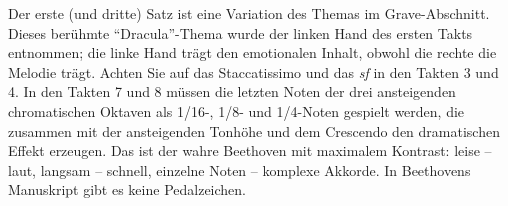Der erste (und dritte) Satz ist eine Variation des Themas im Grave-Abschnitt. 
Dieses berühmte \enquote{Dracula}-Thema wurde der linken Hand des ersten Takts entnommen; die linke Hand trägt den emotionalen Inhalt, obwohl die rechte die Melodie trägt.
Achten Sie auf das Staccatissimo und das \textit{sf} in den Takten 3 und 4.
In den Takten 7 und 8 müssen die letzten Noten der drei ansteigenden chromatischen Oktaven als 1/16-, 1/8- und 1/4-Noten gespielt werden, die zusammen mit der ansteigenden Tonhöhe und dem Crescendo den dramatischen Effekt erzeugen.
Das ist der wahre Beethoven mit maximalem Kontrast: leise -- laut, langsam -- schnell, einzelne Noten -- komplexe Akkorde.
In Beethovens Manuskript gibt es keine Pedalzeichen.



